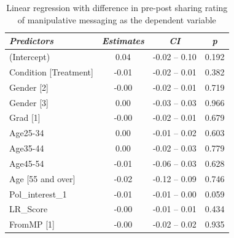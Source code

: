 \documentclass[empirical, authordate]{jote-new-article}
\begin{document}
\begin{table}

  \caption{Linear regression with difference in pre-post sharing rating of manipulative messaging as the dependent variable }
  \label{tab:tableS35}


  \begin{tabularx}{\linewidth}{@{} X  S  S  S@{}}

    \toprule
    \emph{Predictors}                                    & {\emph{Estimates}}                         & {\emph{\emph{CI}}} & {\emph{p}} \\
    \midrule
    (Intercept)                                          & 0.04                                       & -0.02 -- 0.10      & 0.192      \\
    Condition [Treatment]                                & -0.01                                      & -0.02 -- 0.01      & 0.382      \\
    Gender [2]                                           & -0.00                                      & -0.02 -- 0.01      & 0.719      \\
    Gender [3]                                           & 0.00                                       & -0.03 -- 0.03      & 0.966      \\
    Grad [1]                                             & -0.00                                      & -0.02 -- 0.01      & 0.679      \\
    Age25-34                                             & 0.00                                       & -0.01 -- 0.02      & 0.603      \\
    Age35-44                                             & 0.00                                       & -0.02 -- 0.03      & 0.779      \\
    Age45-54                                             & -0.01                                      & -0.06 -- 0.03      & 0.628      \\
    Age [55 and over]                                    & -0.02                                      & -0.12 -- 0.09      & 0.746      \\
    Pol\_interest\_1                                     & -0.01                                      & -0.01 -- 0.00      & 0.059      \\
    LR\_Score                                            & -0.00                                      & -0.01 -- 0.01      & 0.434      \\
    FromMP [1]                                           & -0.00                                      & -0.02 -- 0.02      & 0.935      \\

\end{tabularx}
\end{table}
\end{document}

